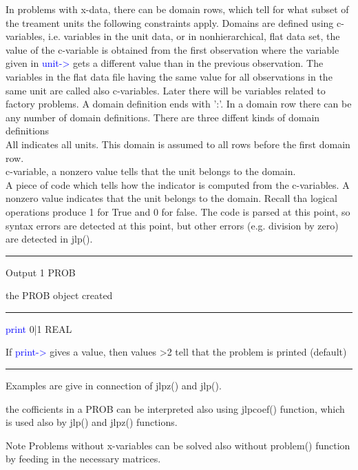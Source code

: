 In problems with x-data, there can be domain rows, which tell for what subset
of the treament units the following constraints apply.
Domains are defined using c-variables, i.e. variables in the unit data,
or in nonhierarchical, flat data set, the value of the c-variable is obtained
from the first observation where the variable given in \textcolor{blue}{unit->} gets a different
value than in the previous observation. The variables in the flat data file
having the same value for all observations in the same unit are called also c-variables.
Later there will be variables related to factory problems.
A domain definition ends with ':'. In a domain row there can be any number of domain definitions.
There are three diffent kinds of domain definitions\\
All indicates all units. This domain is assumed to all rows before the first domain row.\\
c-variable, a nonzero value tells that the unit belongs to the domain.\\
A piece of code which tells how the  indicator is computed from the c-variables. A nonzero value indicates
that the unit belongs to the domain. Recall tha logical operations produce 1 for True and 0 for false.
The code is parsed at this point, so syntax errors are detected at this point,
but other errors (e.g. division by zero) are detected in \textcolor{VioletRed}{jlp}().


\vspace{0.3cm}
\hrule
\vspace{0.3cm}
\noindent Output  \tabto{3cm} 1  \tabto{5cm}   PROB  \tabto{7cm}
\begin{changemargin}{3cm}{0cm}
\noindent  the PROB object created
\end{changemargin}
\vspace{0.3cm}
\hrule
\vspace{0.3cm}
\noindent \textcolor{blue}{print}  \tabto{3cm} 0|1  \tabto{5cm}   REAL  \tabto{7cm}
\begin{changemargin}{3cm}{0cm}
\noindent  If \textcolor{blue}{print->} gives a value, then values >2 tell that the problem is printed (default)
\end {changemargin}
\hrule
\vspace{0.2cm}
\begin{note}
Examples are give in connection of \textcolor{VioletRed}{jlpz}() and \textcolor{VioletRed}{jlp}().
\end{note}
\begin{note}
the cofficients in a PROB can be interpreted also
using \textcolor{VioletRed}{jlpcoef}() function, which is used also by \textcolor{VioletRed}{jlp}() and \textcolor{VioletRed}{jlpz}() functions.
\end{note}
\begin{note}
Note
Problems without x-variables can be solved also without \textcolor{VioletRed}{problem}() function by
feeding in the necessary matrices.
\end{note}

